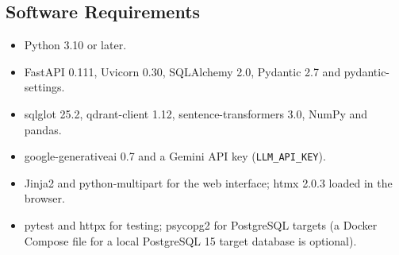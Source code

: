 \subsection{Software Requirements}
\begin{itemize}[leftmargin=*, topsep=4pt, itemsep=3pt]
    \item Python 3.10 or later.
    \item FastAPI 0.111, Uvicorn 0.30, SQLAlchemy 2.0, Pydantic 2.7 and pydantic-settings.
    \item sqlglot 25.2, qdrant-client 1.12, sentence-transformers 3.0, NumPy and pandas.
    \item google-generativeai 0.7 and a Gemini API key (\texttt{LLM\_API\_KEY}).
    \item Jinja2 and python-multipart for the web interface; htmx 2.0.3 loaded in the browser.
    \item pytest and httpx for testing; psycopg2 for PostgreSQL targets (a Docker Compose file
          for a local PostgreSQL 15 target database is optional).
\end{itemize}
